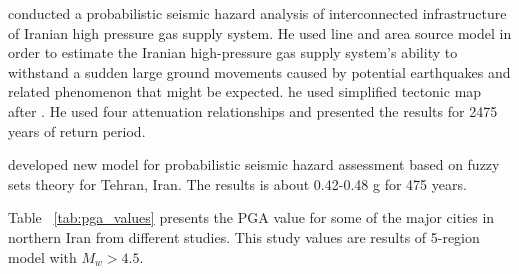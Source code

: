 \citet{Golara2014} conducted a probabilistic seismic hazard analysis of interconnected infrastructure of Iranian high pressure gas supply system. He used line and area source model in order to estimate the Iranian  high-pressure gas supply system's ability to withstand a sudden large ground movements caused by potential earthquakes and related phenomenon that might be expected. he used simplified tectonic map after \citet{Alavi1991}. He used four attenuation relationships and presented the results for 2475 years of return period. 

\citet{Boostan2015} developed new model for probabilistic seismic hazard assessment based on fuzzy sets theory for Tehran, Iran. The results is about 0.42-0.48 g for 475 years. 

Table ~\ref{tab:pga_values} presents the PGA value for some of the major cities in northern Iran from different studies. This study values are results of 5-region model with $M_w > 4.5 $.

